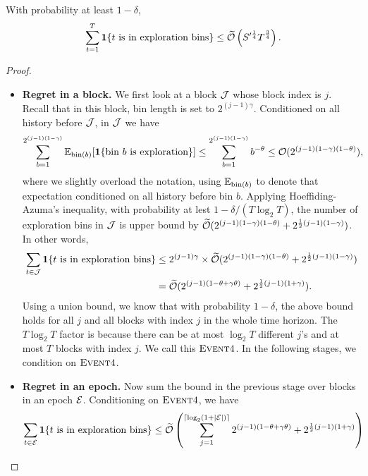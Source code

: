 \begin{lemma}
\label{thm:Ada3 exploration}
With probability at least $1-\delta$, 
\begin{align*}
\sum_{t=1}^T \boldsymbol{1}\{t \text{ is in exploration bins}\} \leq \widetilde{\mathcal{O}}\left( S^{\prime \frac{1}{4}} T^{\frac{3}{4}} \right). 
\end{align*}
\end{lemma}
\begin{proof}
\begin{itemize}[leftmargin=*]
\item \textbf{Regret in a block.}
We first look at a block ${\mathcal{J}}$ whose block index is $j$. Recall that in this block, bin length is set to $2^{(j-1)\gamma}$. Conditioned on all history before ${\mathcal{J}}$, in ${\mathcal{J}}$ we have 
\begin{align*}
\sum_{b=1}^{2^{(j-1)(1-\gamma)}} \mathbb{E}_{\text{bin}(b)} [\boldsymbol{1}\{\text{bin } b \text{ is exploration}\}] \leq \sum_{b=1}^{2^{(j-1)(1-\gamma)}}b^{-\theta}\leq \mathcal{O}(2^{(j-1)(1-\gamma)(1-\theta)}), 
\end{align*}
where we slightly overload the notation, using $\mathbb{E}_{\text{bin}(b)}$ to denote that expectation conditioned on all history before bin $b$. 
Applying Hoeffiding-Azuma's inequality, with probability at lest $1-\delta/(T\log_2 T)$, the number of exploration bins in ${\mathcal{J}}$ is upper bound by $\widetilde{\mathcal{O}}(2^{(j-1)(1-\gamma)(1-\theta)} + 2^{\frac{1}{2}(j-1)(1-\gamma)})$. In other words, 
\begin{align*}
\sum_{t\in{\mathcal{J}}} \boldsymbol{1}\{t \text{ is in exploration bins}\}&\leq 2^{(j-1)\gamma}\times \widetilde{\mathcal{O}}(2^{(j-1)(1-\gamma)(1-\theta)} + 2^{\frac{1}{2}(j-1)(1-\gamma)})\\
&=\widetilde{\mathcal{O}}(2^{(j-1)(1-\theta+\gamma\theta)} + 2^{\frac{1}{2}(j-1)(1+\gamma)}).
\end{align*}
Using a union bound, we know that with probability $1-\delta$, the above bound holds for all $j$ and all blocks with index $j$ in the whole time horizon. The $T\log_2 T$ factor is because there can be at most $\log_2 T$ different $j$'s and at most $T$ blocks with index $j$. We call this $\textsc{Event} 4$. In the following stages, we condition on $\textsc{Event} 4$. 
\item \textbf{Regret in an epoch.}
Now sum the bound in the previous stage over blocks in an epoch ${\mathcal{E}}$. Conditioning on $\textsc{Event} 4$, we have
\begin{align*}
\sum_{t\in\calE} \one\{t \text{ is in exploration bins}\} &\leq \otil\left(\sum_{j=1}^{\ceil{\log_2(1+\abs{\calE})}} 2^{(j-1)(1-\theta+\gamma\theta)} +2^{\frac{1}{2}(j-1)(1+\gamma)} \right)\\

\end{align*}
\end{itemize}
\end{proof}
